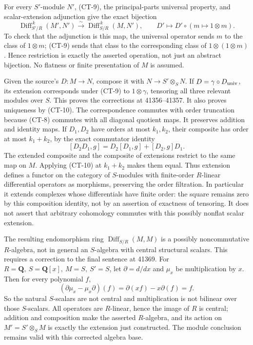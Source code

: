 For every \(S'\)-module \(N'\), (CT-9), the principal-parts universal property, and scalar-extension adjunction give the exact bijection \[
\operatorname{Diff}^{\,k}_{S'/R}(M',N')
\xrightarrow{\sim}\operatorname{Diff}^{\,k}_{S/R}(M,N'),
\qquad D'\longmapsto D'\circ(m\mapsto1\otimes m).
\tag{CT-10}
\] To check that the adjunction is this map, the universal operator sends \(m\) to the class of \(1\otimes m\); (CT-9) sends that class to the corresponding class of \(1\otimes(1\otimes m)\). Hence restriction is exactly the asserted operation, not just an abstract bijection. No flatness or finite presentation of \(M\) is assumed.

Given the source's \(D:M\to N\), compose it with \(N\to S'\otimes_SN\). If \(D=\gamma\circ D_{\rm univ}\), its extension corresponds under (CT-9) to \(1\otimes\gamma\), tensoring all three relevant modules over \(S\). This proves the corrections at 41356--41357. It also proves uniqueness by (CT-10). The correspondence commutes with order truncation because (CT-8) commutes with all diagonal quotient maps. It preserves addition and identity maps. If \(D_1,D_2\) have orders at most \(k_1,k_2\), their composite has order at most \(k_1+k_2\), by the exact commutator identity \[
[D_2D_1,g]=D_2[D_1,g]+[D_2,g]D_1.
\] The extended composite and the composite of extensions restrict to the same map on \(M\). Applying (CT-10) at \(k_1+k_2\) makes them equal. Thus extension defines a functor on the category of \(S\)-modules with finite-order \(R\)-linear differential operators as morphisms, preserving the order filtration. In particular it extends complexes whose differentials have finite order: the square remains zero by this composition identity, not by an assertion of exactness of tensoring. It does not assert that arbitrary cohomology commutes with this possibly nonflat scalar extension.

The resulting endomorphism ring \(\operatorname{Diff}_{S/R}(M,M)\) is a possibly noncommutative \(R\)-algebra, not in general an \(S\)-algebra with central structural scalars. This requires a correction to the final sentence at 41369. For \(R=\mathbf Q,\ S=\mathbf Q[x],\ M=S,\ S'=S\), let \(\partial=d/dx\) and \(\mu_x\) be multiplication by \(x\). Then for every polynomial \(f\), \[
(\partial\mu_x-\mu_x\partial)(f)
 =\partial(xf)-x\partial(f)=f.
\] So the natural \(S\)-scalars are not central and multiplication is not bilinear over those \(S\)-scalars. All operators are \(R\)-linear, hence the image of \(R\) is central; addition and composition make the asserted \(R\)-algebra, and its action on \(M'=S'\otimes_SM\) is exactly the extension just constructed. The module conclusion remains valid with this corrected algebra base.

